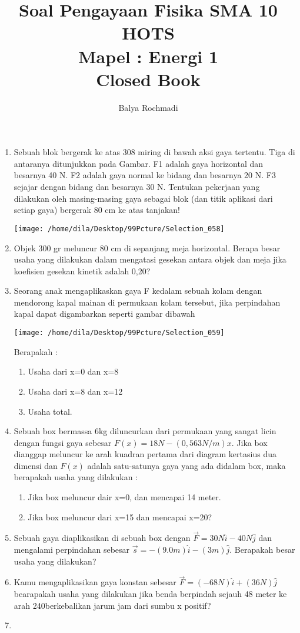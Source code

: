 \documentclass[12pt,a4paper,draft,final,oneside,twoside,openright,openany]{article}
\author{Balya Rochmadi}
\title{Soal Pengayaan Fisika SMA 10 HOTS\\Mapel : Energi 1 \\Closed Book}
\begin{document}
	\maketitle
	\Large
	\noindent\makebox[\linewidth]{\rule{\paperwidth}{0.4pt}}
	\begin{enumerate}
		\item Sebuah blok bergerak ke atas 308 miring di bawah aksi gaya tertentu. Tiga di antaranya ditunjukkan pada Gambar. F1 adalah gaya horizontal dan besarnya 40 N. F2 adalah gaya normal ke bidang dan besarnya 20 N. F3 sejajar dengan bidang dan besarnya 30 N. Tentukan pekerjaan yang dilakukan oleh masing-masing gaya sebagai blok (dan titik aplikasi dari setiap gaya) bergerak 80 cm ke atas tanjakan!
		\begin{center}
			\texttt{[image: /home/dila/Desktop/99Pcture/Selection\_058]}
		\end{center}
		\item Objek 300 gr meluncur 80 cm di sepanjang meja horizontal. Berapa besar usaha yang dilakukan dalam mengatasi gesekan antara objek dan meja jika koefisien gesekan kinetik adalah 0,20?
		\item Seorang anak mengaplikaskan gaya F kedalam sebuah kolam dengan mendorong kapal mainan di permukaan kolam tersebut, jika perpindahan kapal dapat digambarkan seperti gambar dibawah
		\begin{center}
			\texttt{[image: /home/dila/Desktop/99Pcture/Selection\_059]}
		\end{center}
		Berapakah :
		\begin{enumerate}
			\item Usaha dari x=0 dan x=8
			\item Usaha dari x=8 dan x=12
			\item Usaha total.
		\end{enumerate}
		\item Sebuah box bermassa 6kg diluncurkan dari permukaan yang sangat licin dengan fungsi gaya sebesar $F(x)=18N-(0,563N/m)x$. Jika box dianggap meluncur ke arah kuadran pertama dari diagram kertasius dua dimensi dan $F(x)$ adalah satu-satunya gaya yang ada didalam box, maka berapakah usaha yang dilakukan :
		\begin{enumerate}
			\item Jika box meluncur dair x=0, dan mencapai 14 meter.
			\item Jika box meluncur dari x=15 dan mencapai x=20?
		\end{enumerate}
		\item Sebuah gaya diaplikasikan di sebuah box dengan $\vec{F}=30N\hat{i}-40N\hat{j}$ dan mengalami perpindahan sebesar $\vec{s}=-(9.0m)\hat{i}-(3m)\hat{j}$. Berapakah besar usaha yang dilakukan?
		\item Kamu mengaplikasikan gaya konstan sebesar $\vec{F}=(-68 N)\hat{i}+(36N)\hat{j}$ bearapakah usaha yang dilakukan jika benda berpindah sejauh 48 meter ke arah 240\textdegree berkebalikan jarum jam dari sumbu x positif?
		\item 
		
	\end{enumerate}
\end{document}
